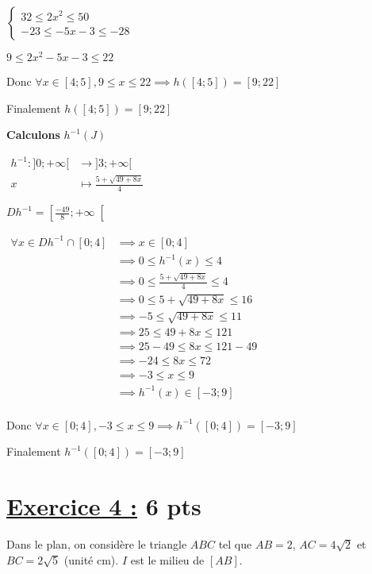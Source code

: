 \documentclass[12pt,a4paper]{article}
\begin{document}
\underline{\( 
\begin{cases}
    32 \leq 2x^{2} \leq 50 \\
    -23 \leq -5x -3 \leq -28 
\end{cases}
\)}

\( 9 \leq 2x^{2}-5x -3 \leq 22  \)

Donc \( \forall x\in [4;5], 9 \leq x \leq 22  \implies h([4;5]) = [ 9 ; 22] \)

Finalement \( h([4 ; 5]) = [ 9 ; 22] \)

\textbf{Calculons }\( h^{-1}(J) \)

$    
\begin{aligned}
        h^{-1} : ]0 ; +\infty[ &\to ]3 ; +\infty[ \\
        x &\mapsto \frac{5+\sqrt{49+8x}}{4}
\end{aligned}
$

 \( Dh^{-1}=\left[\frac{-49}{8};+\infty\right[\)

\( 
\begin{aligned}
    \forall x \in Dh^{-1} \cap [0 ; 4] &\implies x \in [0; 4] \\
                                &\implies 0 \leq h^{-1}(x) \leq 4 \\
                                &\implies 0 \leq \frac{5+\sqrt{49+8x}}{4} \leq 4 \\
                                &\implies 0 \leq 5+\sqrt{49+8x} \leq 16 \\
                                &\implies -5 \leq \sqrt{49+8x} \leq 11 \\
                                &\implies 25 \leq 49+8x \leq 121 \\
                                &\implies 25-49 \leq 8x \leq 121-49 \\
                                &\implies -24 \leq 8x \leq 72 \\
                                &\implies -3 \leq x \leq 9 \\
                                &\implies h^{-1}(x)\in[-3 ; 9] \\
\end{aligned} 
\) 

Donc \( \forall x\in [0;4], -3 \leq x \leq 9  \implies h^{-1}([0;4]) = [ -3 ; 9] \)

Finalement \( h^{-1}([0;4]) = [ -3 ; 9] \)

\section*{\underline{Exercice 4 :} 6 pts }
Dans le plan, on considère le triangle \( ABC \) tel que \( AB = 2 \), \( AC = 4\sqrt{2} \) et \( BC = 2\sqrt{5} \) (unité cm).
\( I \) est le milieu de \( [AB] \).
\end{document}
